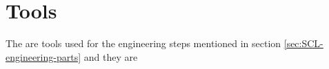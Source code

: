 \section{Tools}

The are tools used for the engineering steps 
mentioned in section \ref{sec:SCL-engineering-parts} 
and they are 

